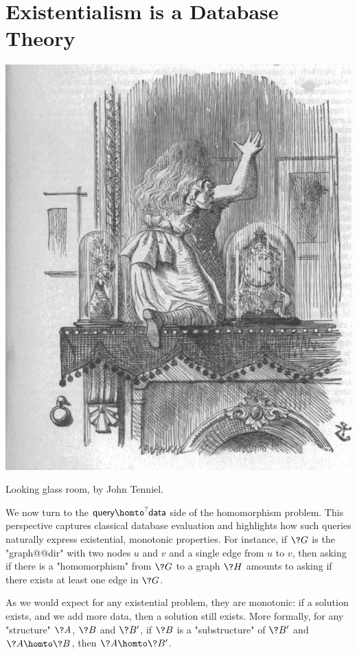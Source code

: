 \section{Existentialism is a Database Theory}
\label{sec:intro-existential}

\begin{marginfigure}
	\centering
	\includegraphics[width=\linewidth]{fig/intro/aliceroom.jpg}
	\caption{Looking glass room, by John Tenniel.}
\end{marginfigure}

We now turn to the $\textsf{query} \homto^? \textsf{data}$ side of the homomorphism problem. This perspective captures classical database evaluation and highlights how such queries naturally express existential, monotonic properties.
For instance, if $\?G$ is the "graph@@dir" with
two nodes $u$ and $v$ and a single edge from $u$ to $v$,
then asking if there is a "homomorphism" from $\?G$ to a graph $\?H$ amounts
to asking if there exists at least one edge in $\?G$.

As we would expect for any existential problem, they are monotonic:
if a solution exists, and we add more data, then a solution still exists.
More formally, for any "structure" $\?A$, $\?B$ and $\?B'$, if $\?B$ is a "substructure"
of $\?B'$ and $\?A \homto \?B$,
then $\?A \homto \?B'$.

